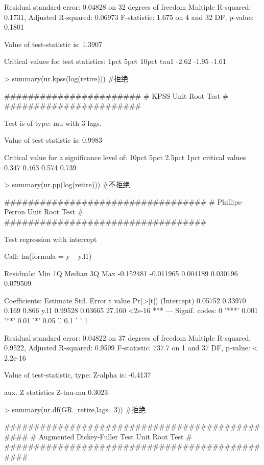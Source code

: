 \documentclass{article}
\begin{document}
\begin{Schunk}
\begin{Soutput}
Residual standard error: 0.04828 on 32 degrees of freedom
Multiple R-squared:  0.1731,	Adjusted R-squared:  0.06973 
F-statistic: 1.675 on 4 and 32 DF,  p-value: 0.1801


Value of test-statistic is: 1.3907 

Critical values for test statistics: 
      1pct  5pct 10pct
tau1 -2.62 -1.95 -1.61
\end{Soutput}
\begin{Sinput}
> summary(ur.kpss(log(retire))) #拒绝
\end{Sinput}
\begin{Soutput}
####################### 
# KPSS Unit Root Test # 
####################### 

Test is of type: mu with 3 lags. 

Value of test-statistic is: 0.9983 

Critical value for a significance level of: 
                10pct  5pct 2.5pct  1pct
critical values 0.347 0.463  0.574 0.739
\end{Soutput}
\begin{Sinput}
> summary(ur.pp(log(retire))) #不拒绝
\end{Sinput}
\begin{Soutput}
################################## 
# Phillips-Perron Unit Root Test # 
################################## 

Test regression with intercept 


Call:
lm(formula = y ~ y.l1)

Residuals:
      Min        1Q    Median        3Q       Max 
-0.152481 -0.011965  0.004189  0.030196  0.079509 

Coefficients:
            Estimate Std. Error t value Pr(>|t|)    
(Intercept)  0.05752    0.33970   0.169    0.866    
y.l1         0.99528    0.03665  27.160   <2e-16 ***
---
Signif. codes:  0 '***' 0.001 '**' 0.01 '*' 0.05 '.' 0.1 ' ' 1

Residual standard error: 0.04822 on 37 degrees of freedom
Multiple R-squared:  0.9522,	Adjusted R-squared:  0.9509 
F-statistic: 737.7 on 1 and 37 DF,  p-value: < 2.2e-16


Value of test-statistic, type: Z-alpha  is: -0.4137 

         aux. Z statistics
Z-tau-mu            0.3023
\end{Soutput}
\begin{Sinput}
> summary(ur.df(GR_retire,lags=3)) #拒绝
\end{Sinput}
\begin{Soutput}
############################################### 
# Augmented Dickey-Fuller Test Unit Root Test # 
############################################### 


\end{Soutput}
\end{Schunk}
\end{document}
